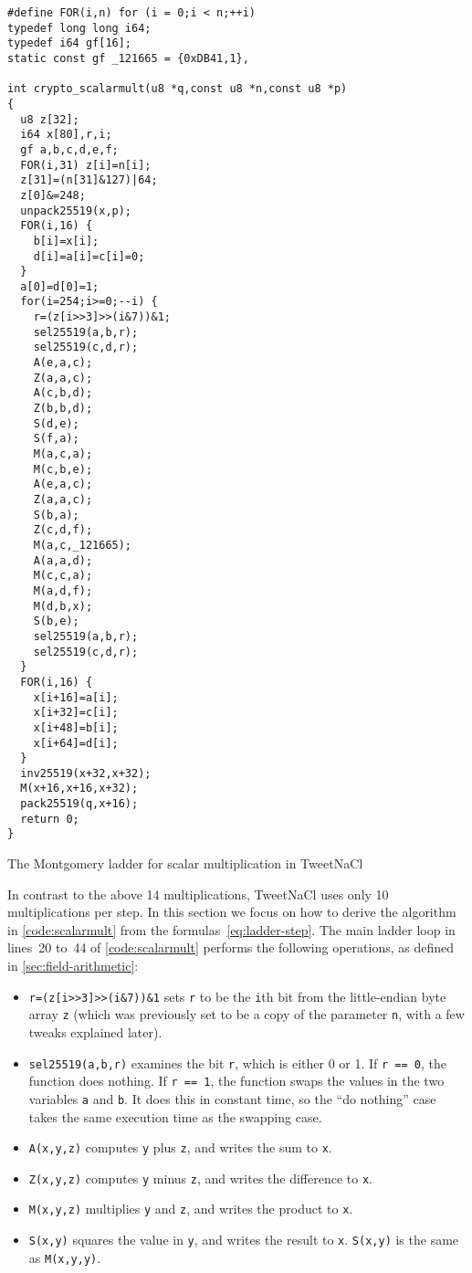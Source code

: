 \documentclass{article}
\begin{document}
\begin{listing}
\begin{verbatim}
#define FOR(i,n) for (i = 0;i < n;++i)
typedef long long i64;
typedef i64 gf[16];
static const gf _121665 = {0xDB41,1},

int crypto_scalarmult(u8 *q,const u8 *n,const u8 *p)
{
  u8 z[32];
  i64 x[80],r,i;
  gf a,b,c,d,e,f;
  FOR(i,31) z[i]=n[i];
  z[31]=(n[31]&127)|64;
  z[0]&=248;
  unpack25519(x,p);
  FOR(i,16) {
    b[i]=x[i];
    d[i]=a[i]=c[i]=0;
  }
  a[0]=d[0]=1;
  for(i=254;i>=0;--i) {
    r=(z[i>>3]>>(i&7))&1;
    sel25519(a,b,r);
    sel25519(c,d,r);
    A(e,a,c);
    Z(a,a,c);
    A(c,b,d);
    Z(b,b,d);
    S(d,e);
    S(f,a);
    M(a,c,a);
    M(c,b,e);
    A(e,a,c);
    Z(a,a,c);
    S(b,a);
    Z(c,d,f);
    M(a,c,_121665);
    A(a,a,d);
    M(c,c,a);
    M(a,d,f);
    M(d,b,x);
    S(b,e);
    sel25519(a,b,r);
    sel25519(c,d,r);
  }
  FOR(i,16) {
    x[i+16]=a[i];
    x[i+32]=c[i];
    x[i+48]=b[i];
    x[i+64]=d[i];
  }
  inv25519(x+32,x+32);
  M(x+16,x+16,x+32);
  pack25519(q,x+16);
  return 0;
}
\end{verbatim}
\caption{The Montgomery ladder for scalar multiplication in TweetNaCl}\label{code:scalarmult}
\end{listing}

In contrast to the above 14 multiplications, TweetNaCl uses only 10 multiplications per step.
In this section we focus on how to derive the algorithm in \autoref{code:scalarmult} from the formulas~\eqref{eq:ladder-step}.
The main ladder loop in lines~20 to~44 of \autoref{code:scalarmult} performs the following operations, as defined in \autoref{sec:field-arithmetic}:
\begin{itemize}
    \item \verb|r=(z[i>>3]>>(i&7))&1| sets \verb|r| to be the \verb|i|th bit from the little-endian byte array \verb|z| (which was previously set to be a copy of the parameter \verb|n|, with a few tweaks explained later).
    \item \verb|sel25519(a,b,r)| examines the bit \verb|r|, which is either 0 or 1.
        If \verb|r == 0|, the function does nothing.
        If \verb|r == 1|, the function swaps the values in the two variables \verb|a| and \verb|b|.
        It does this in constant time, so the ``do nothing'' case takes the same execution time as the swapping case.
    \item \verb|A(x,y,z)| computes \verb|y| plus \verb|z|, and writes the sum to \verb|x|.
    \item \verb|Z(x,y,z)| computes \verb|y| minus \verb|z|, and writes the difference to \verb|x|.
    \item \verb|M(x,y,z)| multiplies \verb|y| and \verb|z|, and writes the product to \verb|x|.
    \item \verb|S(x,y)| squares the value in \verb|y|, and writes the result to \verb|x|.
        \verb|S(x,y)| is the same as \verb|M(x,y,y)|.
\end{itemize}
\end{document}
